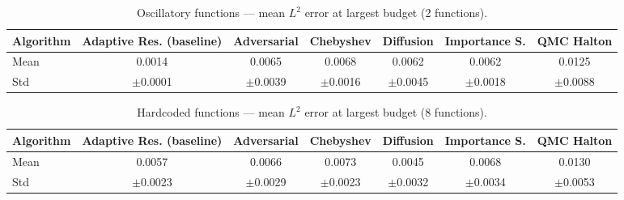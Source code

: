 \begin{table}[htbp]
  \centering
  \caption{Oscillatory functions — mean $L^2$ error at largest budget (2 functions).}
  \small
  \begin{tabular}{@{}lcccccc@{}}
    \toprule
    Algorithm & \textbf{Adaptive Res. (baseline)} & \textbf{Adversarial} & \textbf{Chebyshev} & \textbf{Diffusion} & \textbf{Importance S.} & \textbf{QMC Halton} \\
    \midrule
    Mean & 0.0014 & 0.0065 & 0.0068 & 0.0062 & 0.0062 & 0.0125 \\
    Std & $\pm$0.0001 & $\pm$0.0039 & $\pm$0.0016 & $\pm$0.0045 & $\pm$0.0018 & $\pm$0.0088 \\
    \bottomrule
  \end{tabular}
\end{table}
\begin{table}[htbp]
  \centering
  \caption{Hardcoded functions — mean $L^2$ error at largest budget (8 functions).}
  \small
  \begin{tabular}{@{}lcccccc@{}}
    \toprule
    Algorithm & \textbf{Adaptive Res. (baseline)} & \textbf{Adversarial} & \textbf{Chebyshev} & \textbf{Diffusion} & \textbf{Importance S.} & \textbf{QMC Halton} \\
    \midrule
    Mean & 0.0057 & 0.0066 & 0.0073 & 0.0045 & 0.0068 & 0.0130 \\
    Std & $\pm$0.0023 & $\pm$0.0029 & $\pm$0.0023 & $\pm$0.0032 & $\pm$0.0034 & $\pm$0.0053 \\
    \bottomrule
  \end{tabular}
\end{table}
